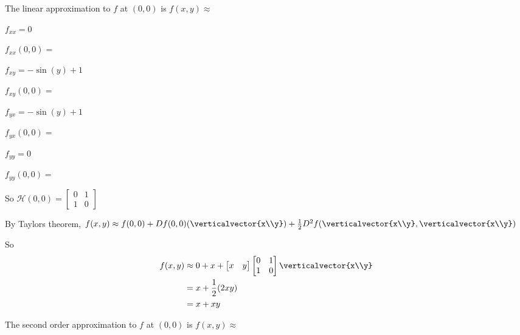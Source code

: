 \documentclass{ximera}
\begin{document}
\begin{question}
\begin{solution}
			The linear approximation to $f$ at $(0,0)$ is $f(x,y) \approx$ 
		\end{solution}
		\begin{solution}
			\begin{hint}
				\begin{question}
					\begin{solution}
						\begin{hint}
							$f_{xx}= 0$
						\end{hint}
						$f_{xx}(0,0) = $
					\end{solution}
					\begin{solution}
						\begin{hint}
							$f_{xy} = -\sin(y)+1$
						\end{hint}
						$f_{xy}(0,0) = $\answer{1}
					\end{solution}
					\begin{solution}
					\begin{hint}
							$f_{yx} = -\sin(y)+1$
						\end{hint}
						$f_{yx}(0,0) = $
					\end{solution}
					\begin{solution}
					\begin{hint}
							$f_{yy} = 0$
						\end{hint}
						$f_{yy}(0,0) = $\answer{0}
					\end{solution}
				\end{question}
			\end{hint}
			\begin{hint}
				So \(\mathcal{H}(0,0) = \begin{bmatrix} 0&1 \\ 1&0\end{bmatrix}\)
			\end{hint}
			\begin{hint}
				By Taylors theorem, $f(x,y) \approx f(0,0)+Df(0,0)(\verticalvector{x\\y})+\frac{1}{2}D^2f(\verticalvector{x\\y},\verticalvector{x\\y})$
			\end{hint}
			\begin{hint}
				So \begin{align*}
				f(x,y) &\approx 0+x+\begin{bmatrix} x & y \end{bmatrix} \begin{bmatrix} 0&1 \\ 1&0\end{bmatrix} \verticalvector{x\\y}\\
					&=x+\frac{1}{2} (2xy)\\
					&=x+xy
					\end{align*}
			\end{hint}
			The second order approximation to $f$ at $(0,0)$ is $f(x,y) \approx$ \answer{$x+xy$}
		\end{solution}
		

\end{question}
\end{document}
